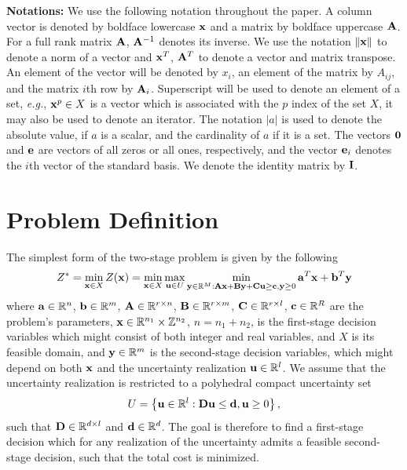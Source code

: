 \documentclass[12pt,x11names]{article}
\theoremstyle{definition}
\newcommand{\paren}[1]{\left\{ {#1} \right\}} %
\newcommand{\real}{\mathbb{R}} %
\newcommand{\integ}{\mathbb{Z}} %
\newcommand{\norm}[1]{\left\Vert {#1} \right\Vert} %
\newcommand{\eg}{{\em e.g.}, }
\newcommand{\bzero}{{\bf 0}}
\newcommand{\bone}{{\bf e}}
\newcommand{\ba}{{\bf a}}
\newcommand{\bb}{{\bf b}}
\newcommand{\bc}{{\bf c}}
\newcommand{\bd}{{\bf d}}
\newcommand{\bu}{{\bf u}}
\newcommand{\bx}{{\bf x}}
\newcommand{\by}{{\bf y}}
\newcommand{\bba}{{\bf A}}
\newcommand{\bbb}{{\bf B}}
\newcommand{\bbc}{{\bf C}}
\newcommand{\bbd}{{\bf D}}
\newcommand{\bbi}{{\bf I}}
\begin{document}
{\noindent \bf Notations:}
We use the following notation throughout the  paper. A column vector is denoted by boldface lowercase $\bx$ and a matrix by boldface uppercase $\bba$.  For a full rank matrix $\bba$, $\bba^{-1}$ denotes its inverse. We use the notation $\norm{\bx}$ to denote a norm of a vector and $\bx^T$, $\bba^T$ to denote a vector and matrix transpose. An element of the vector will be denoted by $x_i$, an element of the matrix by $A_{ij}$, and the matrix $i$th row by $\bba_i$.  Superscript will be used to denote an element of a set, \eg $\bx^p\in X$ is a vector which is associated with the $p$ index of the set $X$, it may also be used to denote an iterator. The notation $|a|$ is used to denote the absolute value, if $a$ is a scalar, and the cardinality of $a$ if it is a set. The vectors $\bzero$ and $\bone$ are vectors of all zeros or all ones, respectively, and the vector $\bone_i$ denotes the $i$th vector of the standard basis. We denote the identity matrix by $\bbi$.

\iffalse
\section{Problem Definition}
The simplest form of the two-stage problem is given by the following
\begin{equation}
\begin{aligned}
Z^*=\min_{\bx\in X} Z(\bx)=\min_{\bx\in X}\max_{\bu\in U} \min_{\by\in \real^M:\bba\bx+\bbb\by+\bbc\bu\geq \bc, \by\geq 0} \ba^T\bx+\bb^T\by
\end{aligned}
\end{equation}
where $\ba\in \real^n$, $\bb\in\real^m$, $\bba\in\real^{r\times n}$, $\bbb\in \real^{r\times m}$, $\bbc\in \real^{r\times l}$, $\bc\in \real^{R}$ are the problem's parameters, $\bx\in \real^{n_1}\times \integ^{n_2}$, $n=n_1+n_2$, is the first-stage decision variables which might consist of both integer and real variables, and $X$ is its feasible domain, and $\by\in \real^m$ is the second-stage decision variables, which might depend on both $\bx$ and the uncertainty realization $\bu\in\real^l$. We assume that the uncertainty realization is restricted to a polyhedral compact uncertainty set $$U=\paren{\bu\in \real^{l}:\bbd\bu\leq \bd, \bu\geq0},$$ such that $\bbd\in \real^{d\times l}$ and $\bd\in \real^d$. The goal is therefore to find a first-stage decision which for any realization of the uncertainty admits a feasible second-stage decision, such that the total cost is minimized.
\end{document}
